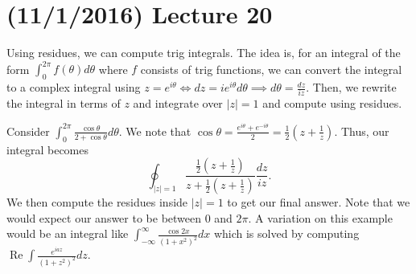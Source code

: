 \documentclass[11pt,leqno,oneside]{amsart}
\renewcommand{\Re}{\operatorname{Re}}
\begin{document}
  \section{(11/1/2016) Lecture 20}
  Using residues, we can compute trig integrals. The idea is, for an
  integral of the form $\int_0^{2\pi} f(\theta) d\theta$ where $f$
  consists of trig functions, we can convert the integral to a complex
  integral using $z = e^{i \theta} \iff dz = ie^{i \theta}d\theta
  \implies d\theta = \frac{dz}{iz}$. Then, we rewrite the integral in
  terms of $z$ and integrate over $|z|=1$ and compute using residues.
  \begin{example}
    Consider $\int_0^{2\pi} \frac{\cos \theta}{2+\cos \theta}
    d\theta$. We note that $\cos \theta = \frac{e^{i \theta} + e^{-i
        \theta}}{2} = \frac{1}{2}(z+\frac{1}{z})$. Thus, our integral
    becomes \[\oint_{|z|=1}
    \frac{\frac{1}{2}(z+\frac{1}{z})}{z+\frac{1}{2}(z+\frac{1}{z})}
    \frac{dz}{iz}.\]
    We then compute the residues inside $|z|=1$ to get our final
    answer. Note that we would expect our answer to be between 0 and
    $2\pi$. A variation on this example would be an integral like
    $\int_{-\infty}^\infty \frac{\cos 2x}{(1+x^2)^2} dx$ which is
    solved by computing $\Re \int \frac{e^{iaz}}{(1+z^2)^2}dz$. 
  \end{example}
\end{document}
